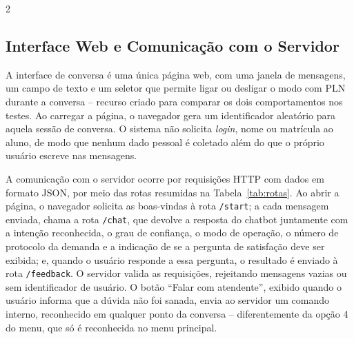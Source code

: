 \documentclass[10pt]{article}
\begin{document}
\begin{multicols}{2}

\subsection{Interface Web e Comunicação com o Servidor}\label{sec:api}

A interface de conversa é uma única página web, com uma janela de mensagens, um
campo de texto e um seletor que permite ligar ou desligar o modo com PLN
durante a conversa -- recurso criado para comparar os dois comportamentos nos
testes. Ao carregar a página, o navegador gera um identificador aleatório para
aquela sessão de conversa. O sistema não solicita \textit{login}, nome ou
matrícula ao aluno, de modo que nenhum dado pessoal é coletado além do que o
próprio usuário escreve nas mensagens.

A comunicação com o servidor ocorre por requisições HTTP com dados em formato
JSON, por meio das rotas resumidas na Tabela~\ref{tab:rotas}. Ao abrir a
página, o navegador solicita as boas-vindas à rota \texttt{/start}; a cada
mensagem enviada, chama a rota \texttt{/chat}, que devolve a resposta do
chatbot juntamente com a intenção reconhecida, o grau de confiança, o modo de
operação, o número de protocolo da demanda e a indicação de se a pergunta de
satisfação deve ser exibida; e, quando o usuário responde a essa pergunta, o
resultado é enviado à rota \texttt{/feedback}. O servidor valida as
requisições, rejeitando mensagens vazias ou sem identificador de usuário. O
botão ``Falar com atendente'', exibido quando o usuário informa que a dúvida não
foi sanada, envia ao servidor um comando interno, reconhecido em qualquer ponto
da conversa -- diferentemente da opção 4 do menu, que só é reconhecida no menu
principal.

\end{multicols}
\end{document}
